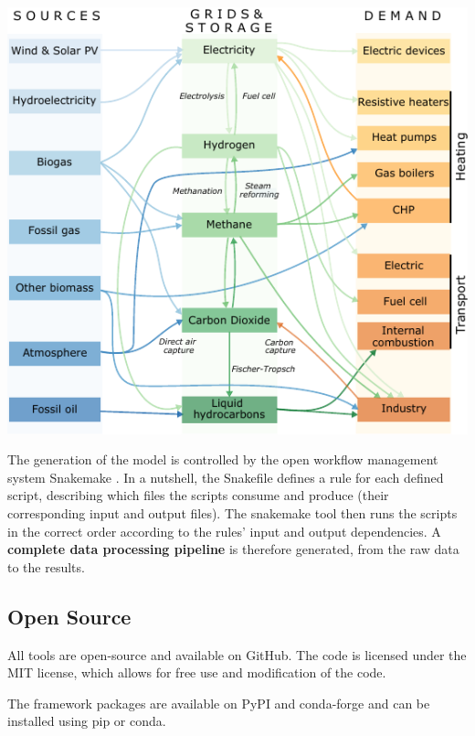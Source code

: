 \documentclass[a0,portrait]{a0poster}
\begin{document}
\begin{multicols}{3}
\begin{center}\vspace{1cm}
  \includegraphics[width=0.7\linewidth]{multisector_figure.pdf}
\end{center}\vspace{1cm}

\noindent
The generation of the model is controlled by the open workflow management system 
Snakemake \cite{Snakemake}. In a nutshell, the Snakefile defines a rule for each defined script, 
describing which files the scripts consume and produce 
(their corresponding input and output files). The snakemake tool then runs the scripts 
in the correct order according to the rules’ input and output dependencies. A \textbf{complete
data processing pipeline} is therefore generated, from the raw data to the results.

\vspace{2em}

\begin{tcolorbox}[width=0.95\linewidth,colback={conclusion},frame empty,boxsep=1cm]
\section*{Open Source}
  All tools are open-source and available on GitHub. The code is licensed under the MIT
  license, which allows for free use and modification of the code. 
  
  The framework packages are available on PyPI and conda-forge and can be installed using pip or conda.
\end{tcolorbox}    

\columnbreak


\end{multicols}
\end{document}
